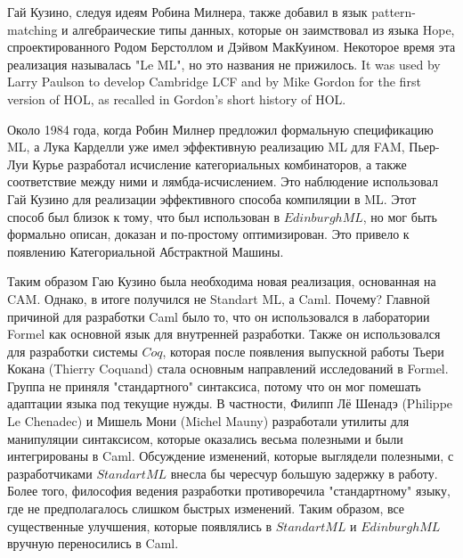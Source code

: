 \documentclass[14pt]{matmex-diploma-custom}
\begin{document}
Гай Кузино, следуя идеям Робина Милнера, также добавил в язык pattern-matching и алгебраические типы данных, которые он заимствовал из языка Hope, спроектированного Родом Берстоллом и Дэйвом МакКуином. Некоторое время эта реализация называлась "Le ML", но это названия не прижилось. It was used by Larry Paulson to develop Cambridge LCF and by Mike Gordon for the first version of HOL, as recalled in Gordon's short history of HOL.

Около 1984 года, когда Робин Милнер предложил формальную спецификацию ML, а Лука Карделли уже имел эффективную реализацию ML для FAM, Пьер-Луи Курье разработал исчисление категориальных комбинаторов, а также соответствие между ними и лямбда-исчислением. Это наблюдение использовал Гай Кузино для реализации эффективного способа компиляции в ML. Этот способ был близок к тому, что был использован в $Edinburgh ML$, но мог быть формально описан, доказан и по-простому оптимизирован. Это привело к появлению Категориальной Абстрактной Машины. 

Таким образом Гаю Кузино была необходима новая реализация, основанная на CAM. Однако, в итоге получился не Standart ML, а Caml. Почему? Главной причиной для разработки Caml было то, что он использовался в лаборатории Formel как основной язык для внутренней разработки. Также он использовался для разработки системы $Coq$, которая после появления выпускной работы Тьери Кокана (Thierry Coquand) стала основным направлений исследований в Formel. Группа не приняля  "стандартного" синтаксиса, потому что он мог помешать адаптации языка под текущие нужды. В частности, Филипп Лё Шенадэ (Philippe Le Chenadec) и Мишель Мони (Michel Mauny) разработали утилиты для манипуляции синтаксисом, которые оказались весьма полезными и были интегрированы в Caml. Обсуждение изменений, которые выглядели полезными, с разработчиками $Standart ML$ внесла бы чересчур большую задержку в работу. Более того, философия ведения разработки противоречила "стандартному" языку, где не предполагалось слишком быстрых изменений. Таким образом, все существенные улучшения, которые появлялись в $Standart ML$ и $Edinburgh ML$ вручную переносились в Caml.
\end{document}
